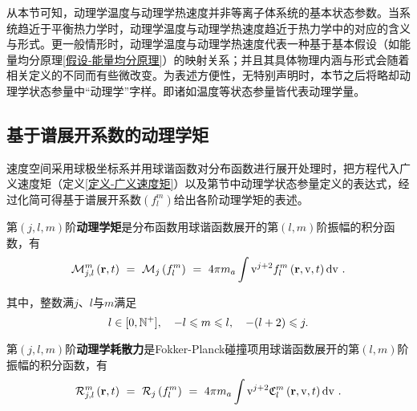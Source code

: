   从本节可知，动理学温度与动理学热速度并非等离子体系统的基本状态参数。当系统趋近于平衡热力学时，动理学温度与动理学热速度趋近于热力学中的对应的含义与形式。更一般情形时，动理学温度与动理学热速度代表一种基于基本假设（如能量均分原理\ref{假设-能量均分原理}）的映射关系；并且其具体物理内涵与形式会随着相关定义的不同而有些微改变。为表述方便性，无特别声明时，本节之后将略却动理学状态参量中“动理学”字样。即诸如温度等状态参量皆代表动理学量。
  
  \subsection{基于谱展开系数的动理学矩}
  \label{基于谱展开系数的动理学矩}
  
   速度空间采用球极坐标系并用球谐函数对分布函数进行展开处理时，把方程代入广义速度矩（定义\ref{定义-广义速度矩}）以及第节中动理学状态参量定义的表达式，经过化简可得基于谱展开系数$(f_l^m)$给出各阶动理学矩的表述。
   \begin{definition} \label{定义-动理学矩}
       第$(j,l,m)$阶\textbf{动理学矩}是分布函数用球谐函数展开的第$(l,m)$阶振幅的积分函数，有
      \begin{equation}
        \calM_{j,l}^m \left(\r,t \right) \ = \ \calM_j \left(f_l^m \right) \ = \ 4 \pi m_a \int \rmv^{j+2} \flm \left(\r,\rmv,t \right) \rmd \rmv ~. \label{Mjlm}
      \end{equation}
   \end{definition}
   \noindent
   其中，整数满$j$、$l$与$m$满足
      \begin{equation}
            l \in [0, \mathbb{N}^+], \quad -l \leqslant m \leqslant l, \quad -(l+2) \leqslant j.
      \end{equation}
   
   \begin{definition} \label{定义-动理学耗散力}
       第$(j,l,m)$阶\textbf{动理学耗散力}是Fokker-Planck碰撞项用球谐函数展开的第$(l,m)$阶振幅的积分函数，有
      \begin{equation}
        \calR_{j,l}^m \left(\r,t \right) \ = \ \calR_j \left(f_l^m \right) \ = \ 4 \pi m_a \int \rmv^{j+2} \collma \left(\r,\rmv,t \right) \rmd \rmv ~. \label{Rjlm}
      \end{equation}
   \end{definition}
   
